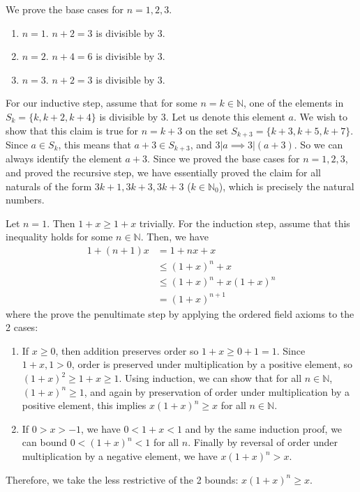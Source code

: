 \documentclass{article}
\begin{document}
    \begin{exercise}
      We prove the base cases for $n = 1, 2, 3$. 
      \begin{enumerate}
        \item $n = 1$. $n+2 = 3$ is divisible by $3$. 
        \item $n = 2$. $n+4 = 6$ is divisible by $3$. 
        \item $n = 3$. $n+2 = 3$ is divisible by $3$. 
      \end{enumerate} 
      For our inductive step, assume that for some $n = k \in \mathbb{N}$, one of the elements in $S_k = \{k, k+2, k+4\}$ is divisible by $3$. Let us denote this element $a$. We wish to show that this claim is true for $n = k+3$ on the set $S_{k+3} = \{k+3, k+5, k+7\}$. Since $a \in S_k$, this means that $a+3 \in S_{k+3}$, and $3 | a \implies 3 | (a+3)$. So we can always identify the element $a+3$. Since we proved the base cases for $n=1, 2, 3$, and proved the recursive step, we have essentially proved the claim for all naturals of the form $3k+1, 3k+3, 3k+3$ ($k \in \mathbb{N}_0$), which is precisely the natural numbers. 
    \end{exercise}

    \begin{exercise}
      Let $n = 1$. Then $1 + x \geq 1 + x$ trivially. For the induction step, assume that this inequality holds for some $n \in \mathbb{N}$. Then, we have 
      \begin{align}
        1 + (n+1) x & = 1 + nx + x \\
                    & \leq (1+x)^n + x \\ 
                    & \leq (1+x)^n + x(1+x)^n \\
                    & = (1+x)^{n+1}
      \end{align} 
      where the prove the penultimate step by applying the ordered field axioms to the 2 cases: 
      \begin{enumerate}
        \item If $x \geq 0$, then addition preserves order so $1 + x \geq 0 + 1 = 1$. Since $1 + x, 1 > 0$, order is preserved under multiplication by a positive element, so $(1+x)^2 \geq 1+x \geq 1$. Using induction, we can show that for all $n \in \mathbb{N}$, $(1+x)^n \geq 1$, and again by preservation of order under multiplication by a positive element, this implies $x (1 + x)^n \geq x$ for all $n \in \mathbb{N}$. 
        \item If $0 > x > -1$, we have $0 < 1 + x < 1$ and by the same induction proof, we can bound $0 < (1+x)^n < 1$ for all $n$. Finally by reversal of order under multiplication by a negative element, we have $x (1+x)^n > x$. 
      \end{enumerate}
      Therefore, we take the less restrictive of the 2 bounds: $x(1+x)^n \geq x$. 
    \end{exercise}
\end{document}
